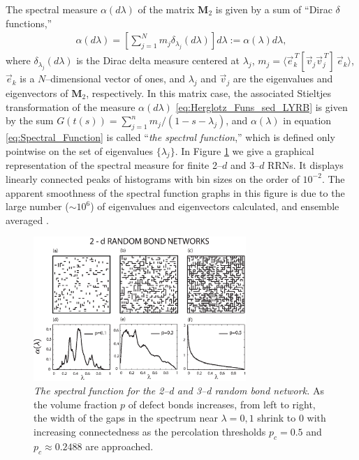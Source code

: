 \documentclass[jmp,graphicx]{revtex4-1}
\begin{document}
The spectral measure $\alpha(d\lambda)$ of the matrix $\mathbf{M}_2$ is given by
a sum of ``Dirac $\delta$ functions,''
%
\begin{align}\label{eq:Spectral_Function}
  \alpha(d\lambda)=
    \left[\sum_{j=1}^N m_j \delta_{\lambda_j}(d\lambda)\right]d\lambda
      :=\alpha(\lambda)d\lambda,
\end{align}
%
where $\delta_{\lambda_j}(d\lambda)$ is the Dirac delta measure centered at $\lambda_j$,
$m_j=\langle\vec{e}_k^{\,T}[\vec{v}_j\vec{v}_j^{\,T}]\,\vec{e}_k\rangle$, 
$\vec{e}_k$ is a $N$--dimensional vector of ones, and $\lambda_j$ and
$\vec{v}_j$ are the eigenvalues and eigenvectors of $\mathbf{M}_2$,
respectively. In this matrix case, the associated Stieltjes
transformation of the measure $\alpha(d\lambda)$ \eqref{eq:Herglotz_Funs_sed_LYRB} is
given by the sum $G(t(s))=\sum_{j=1}^nm_j/(1-s-\lambda_j)$, and $\alpha(\lambda)$ in equation
\eqref{eq:Spectral_Function} is called ``\emph{the spectral
  function},'' which is defined only pointwise on the set of
eigenvalues $\{\lambda_j\}$. In Figure \ref{fig:2D-RRN} we give a graphical
representation of the spectral measure for finite 2--$d$ and 3--$d$
RRNs. It displays linearly connected peaks of histograms with bin
sizes on the order of $10^{-2}$. The apparent smoothness of the
spectral function graphs in this figure is due to the large number
($\sim10^6$) of eigenvalues and eigenvectors calculated, and ensemble
averaged \cite{Golden:JoB:337}. 
%
\begin{figure}\label{fig:2D-RRN}
\includegraphics[width=19pc]{2-d_Random_Resistor_Networks.eps}%
\caption{\emph{The spectral function for the 2--d and 3--d random bond
    network.} As the volume fraction $p$ of defect bonds increases,
  from left to right, the width of the gaps in the spectrum near
  $\lambda=0,1$ shrink to 0 with increasing connectedness as the percolation
  thresholds $p_c=0.5$ and $p_c\approx0.2488$ are approached.}%
\end{figure}
%
\end{document}
